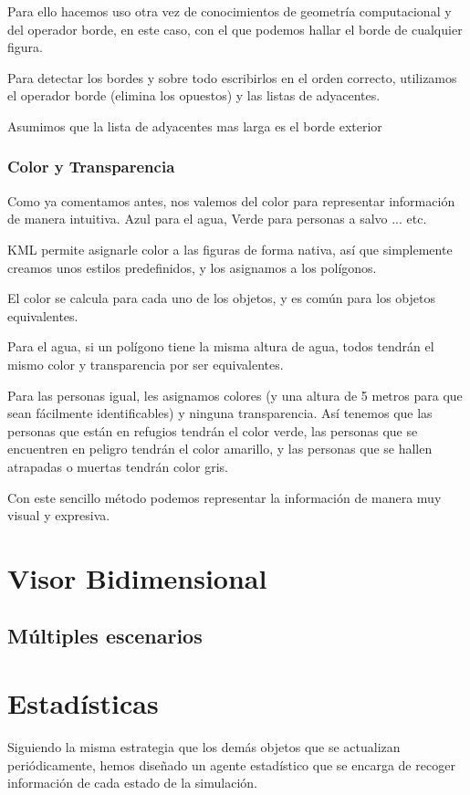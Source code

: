 Para ello hacemos uso otra vez de conocimientos de geometría computacional y
del operador borde, en este caso, con el que podemos hallar el borde de
cualquier figura.

Para detectar los bordes y sobre todo escribirlos en el orden correcto,
utilizamos el operador borde (elimina los opuestos) y las listas de adyacentes.

Asumimos que la lista de adyacentes mas larga es el borde exterior
\subsubsection*{Color y Transparencia}
Como ya comentamos antes, nos valemos del color para representar información de
manera intuitiva. Azul para el agua, Verde para personas a salvo ... etc.

KML permite asignarle color a las figuras de forma nativa, así que simplemente
creamos unos estilos predefinidos, y los asignamos a los polígonos.

El color se calcula para cada uno de los objetos, y es común para los objetos
equivalentes. 

Para el agua, si un polígono tiene la
misma altura de agua, todos tendrán el mismo color y transparencia por ser
equivalentes.

Para las personas igual, les asignamos colores (y una altura de 5 metros para
que sean fácilmente identificables) y ninguna transparencia.
Así tenemos que las personas que están en refugios tendrán el color verde, las
personas que se encuentren en peligro tendrán el color amarillo, y las personas
que se hallen atrapadas o muertas tendrán color gris.

Con este sencillo método podemos representar la información de manera muy
visual y expresiva.
\section*{Visor Bidimensional}
\subsection*{Múltiples escenarios}
\section*{Estadísticas}
Siguiendo la misma estrategia que los demás objetos que se actualizan
periódicamente, hemos diseñado un agente estadístico que se encarga de recoger
información de cada estado de la simulación.


